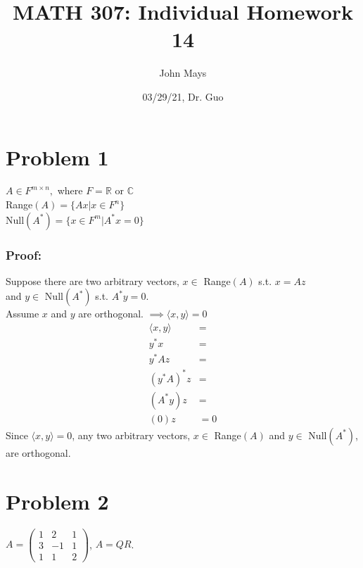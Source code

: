 \documentclass[fleqn]{article}
\title{\textbf{MATH 307: Individual Homework 14}}
\author{John Mays}
\date{03/29/21, Dr. Guo}
\begin{document}
\maketitle

\section*{Problem 1}
$A\in F^{m\times n},$ where $F=\mathbb{R}$ or $\mathbb{C}$\\
Range$(A)=\{Ax|x\in F^{n}\}$\\
Null$(A^{*})=\{x\in F^m|A^{*}x=0\}$\\
\subsubsection*{Proof:}
Suppose there are two arbitrary vectors, $x\in$ Range$(A)$ s.t. $x=Az$\\ and $y\in$ Null$(A^{*})$ s.t. $A^{*}y=0$.\\
\linebreak
Assume $x$ and $y$ are orthogonal.  $\implies \langle x, y \rangle = 0$
\begin{equation*}
    \begin{split}
        \langle x,y \rangle &= \\
        y^{*}x &= \\
        y^{*}Az &= \\
        (y^{*}A)^{*}z &= \\
        (A^{*}y)z &= \\
        (0)z &= 0
    \end{split}
\end{equation*}
Since $\langle x,y \rangle = 0$, any two arbitrary vectors, $x\in$ Range$(A)$ and $y\in$ Null$(A^{*})$, are orthogonal.
\pagebreak
\section*{Problem 2}
$A=\begin{pmatrix}1&2&1\\3&-1&1\\1&1&2\end{pmatrix}$, $A=QR$.\\
\end{document}
